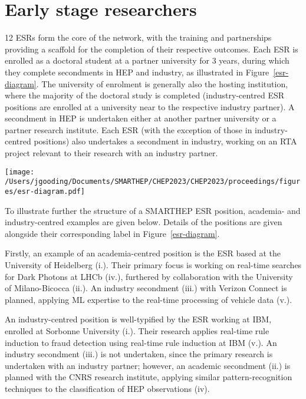 \section{Early stage researchers}
\label{esrs}
12 ESRs form the core of the network, with the training and partnerships providing a scaffold for the completion of their respective outcomes. Each ESR is enrolled as a doctoral student at a partner university for 3 years, during which they complete secondments in HEP and industry, as illustrated in Figure~\ref{esr-diagram}. The university of enrolment is generally also the hosting institution, where the majority of the doctoral study is completed (industry-centred ESR positions are enrolled at a university near to the respective industry partner). A secondment in HEP is undertaken either at another partner university or a partner research institute. Each ESR (with the exception of those in industry-centred positions) also undertakes a secondment in industry, working on an RTA project relevant to their research with an industry partner.

\begin{figure*}[h!]
    \centering
    \texttt{[image: /Users/jgooding/Documents/SMARTHEP/CHEP2023/CHEP2023/proceedings/figures/esr-diagram.pdf]}
    \caption{Structure of a SMARTHEP ESR position. Each ESR is enrolled (i.), during which they will undertake secondments with network partners in HEP (ii.) and industry (iii.). Through the combination of primary and secondment work, each ESR will complete goals in HEP (iv.) and industry (v.), discussed in further detail in Section~\ref{outcomes}. Precise durations of the secondments vary between ESR positions.}
    \label{esr-diagram}
\end{figure*}

To illustrate further the structure of a SMARTHEP ESR position, academia- and industry-centred examples are given below. Details of the positions are given alongside their corresponding label in Figure~\ref{esr-diagram}.

Firstly, an example of an academia-centred position is the ESR based at the University of Heidelberg (i.). Their primary focus is working on real-time searches for Dark Photons at LHCb (iv.), furthered by collaboration with the University of Milano-Bicocca (ii.). An industry secondment (iii.) with Verizon Connect is planned, applying ML expertise to the real-time processing of vehicle data (v.). 

An industry-centred position is well-typified by the ESR working at IBM, enrolled at Sorbonne University (i.). Their research applies real-time rule induction to fraud detection using real-time rule induction at IBM (v.). An industry secondment (iii.) is not undertaken, since the primary research is undertaken with an industry partner; however, an academic secondment (ii.) is planned with the CNRS research institute, applying similar pattern-recognition techniques to the classification of HEP observations (iv).
